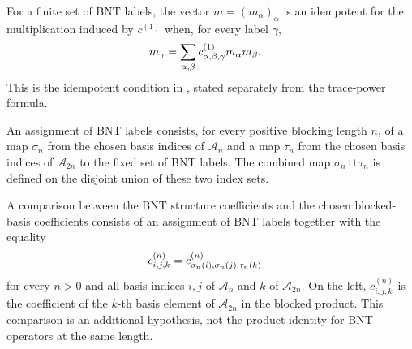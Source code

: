 \begin{definition}%
    \label{def:mpdo_bnt_label_idempotent_coefficient_form}
    \leanok
    For a finite set of BNT labels, the vector $m=(m_\alpha)_\alpha$ is an
    idempotent for the multiplication induced by $c^{(1)}$ when, for every
    label $\gamma$,
    \begin{align}
        m_\gamma
         & =
        \sum_{\alpha,\beta}
        c^{(1)}_{\alpha,\beta,\gamma}m_\alpha m_\beta.
        \notag
    \end{align}
    This is the idempotent condition in
    \cite[Theorem~4.14(ii)]{Cirac2016MPDO_arXiv}, stated separately from
    the trace-power formula.
\end{definition}

\begin{definition}%
    \label{def:mpdo_bnt_blocked_basis_label_assignment}
    \leanok
    An assignment of BNT labels consists, for every positive blocking length
    $n$, of a map $\sigma_n$ from the chosen basis indices of
    $\mathcal A_n$ and a map $\tau_n$ from the chosen basis indices of
    $\mathcal A_{2n}$ to the fixed set of BNT labels. The combined
    map $\sigma_n \sqcup \tau_n$ is defined on the disjoint union of these
    two index sets.
\end{definition}

\begin{definition}%
    \label{def:mpdo_bnt_blocked_basis_coefficient_comparison}
    \leanok
    A comparison between the BNT structure coefficients and the chosen
    blocked-basis coefficients consists of an assignment of BNT labels
    together with the equality
    \begin{align}
        c^{(n)}_{i,j,k}
         & =
        c^{(n)}_{\sigma_n(i),\sigma_n(j),\tau_n(k)}
        \notag
    \end{align}
    for every $n>0$ and all basis indices $i,j$ of $\mathcal A_n$ and $k$
    of $\mathcal A_{2n}$.
    On the left, $c^{(n)}_{i,j,k}$ is the coefficient of the $k$-th basis
    element of $\mathcal A_{2n}$ in the blocked product. This comparison is
    an additional hypothesis, not the product identity for BNT operators
    at the same length.
\end{definition}

